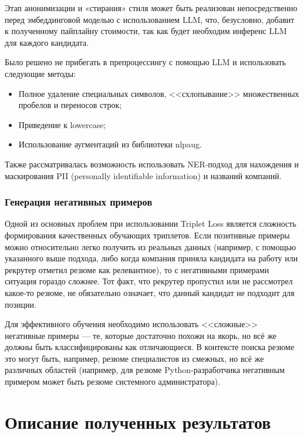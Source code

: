\documentclass[14pt]{mmcs_article}
\begin{document}
Этап анонимизации и «стирания» стиля может быть реализован непосредственно перед эмбеддинговой моделью с использованием LLM, что, безусловно, добавит к полученному пайплайну стоимости, так как будет необходим инференс LLM для каждого кандидата.

Было решено не прибегать в препроцессингу с помощью LLM и использовать следующие методы:

\begin{itemize}
  \item Полное удаление специальных символов, <<схлопывание>> множественных пробелов и переносов строк;
  \item Приведение к lowercase;
  \item Использование аугментаций из библиотеки nlpaug.
\end{itemize}

Также рассматривалась возможность использовать NER-подход для нахождения и маскирования PII (personally identifiable information) и названий компаний.

\subsubsection{Генерация негативных примеров}

Одной из основных проблем при использовании Triplet Loss является сложность формирования качественных обучающих триплетов. Если позитивные примеры можно относительно легко получить из реальных данных (например, с помощью указанного выше подхода, либо когда компания приняла кандидата на работу или рекрутер отметил резюме как релевантное), то с негативными примерами ситуация гораздо сложнее. Тот факт, что рекрутер пропустил или не рассмотрел какое-то резюме, не обязательно означает, что данный кандидат не подходит для позиции.

Для эффективного обучения необходимо использовать <<сложные>> негативные примеры --- те, которые достаточно похожи на якорь, но всё же должны быть классифицированы как отличающиеся. В контексте поиска резюме это могут быть, например, резюме специалистов из смежных, но всё же различных областей (например, для резюме Python-разработчика негативным примером может быть резюме системного администратора).


\newpage
\section{Описание полученных результатов}\label{dsfs}
\end{document}
